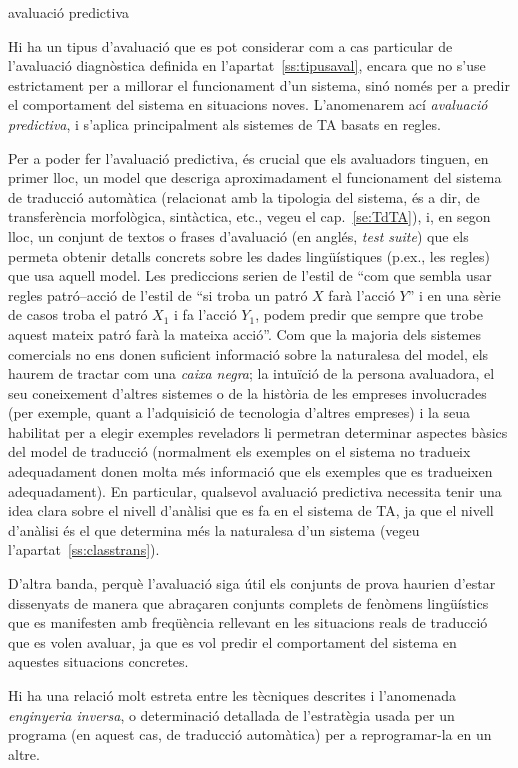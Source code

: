 \begin{persabermes}{avaluació predictiva}

  Hi ha un tipus d'avaluació que es pot considerar com a cas
  particular de l'avaluació diagnòstica definida en
  l'apartat~\ref{ss:tipusaval}, encara que no s'use estrictament per a
  millorar el funcionament d'un sistema, sinó només per a predir el
  comportament del sistema en situacions noves.  L'anomenarem ací
  \emph{avaluació predictiva}, i s'aplica principalment als sistemes
  de TA basats en regles.

  Per a poder fer l'avaluació predictiva, és crucial que els
  avaluadors tinguen, en primer lloc, un model que descriga
  aproximadament el funcionament del sistema de traducció automàtica
  (relacionat amb la tipologia del sistema, és a dir, de transferència
  morfològica, sintàctica, etc., vegeu el cap.~\ref{se:TdTA}), i, en
  segon lloc, un conjunt de textos o frases d'avaluació (en anglés,
  \emph{test suite}) que els permeta obtenir detalls concrets sobre
  les dades lingüístiques (p.ex., les regles) que usa aquell model.
  Les prediccions serien de l'estil de ``com que sembla usar regles
  patró--acció de l'estil de ``si troba un patró $X$ farà l'acció
  $Y$'' i en una sèrie de casos troba el patró $X_1$ i fa l'acció
  $Y_1$, podem predir que sempre que trobe aquest mateix patró farà la
  mateixa acció''. Com que la majoria dels sistemes comercials no ens
  donen suficient informació sobre la naturalesa del model, els haurem
  de tractar com una \emph{caixa negra}; la intuïció de la persona
  avaluadora, el seu coneixement d'altres sistemes o de la història de
  les empreses involucrades (per exemple, quant a l'adquisició de
  tecnologia d'altres empreses) i la seua habilitat per a elegir
  exemples reveladors li permetran determinar aspectes bàsics del
  model de traducció (normalment els exemples on el sistema no
  tradueix adequadament donen molta més informació que els exemples
  que es tradueixen adequadament). En particular, qualsevol avaluació
  predictiva necessita tenir una idea clara sobre el nivell d'anàlisi
  que es fa en el sistema de TA, ja que el nivell d'anàlisi és el que
  determina més la naturalesa d'un sistema (vegeu
  l'apartat~\ref{ss:classtrans}).  


  D'altra banda, perquè l'avaluació siga útil els conjunts de prova
  haurien d'estar dissenyats de manera que abraçaren conjunts complets
  de fenòmens lingüístics que es manifesten amb freqüència rellevant
  en les situacions reals de traducció que es volen avaluar, ja que es
  vol predir el comportament del sistema en aquestes situacions
  concretes.


  Hi ha una relació molt estreta entre les tècniques descrites i
  l'anomenada \emph{enginyeria inversa}, o determinació detallada de
  l'estratègia usada per un programa (en aquest cas, de traducció
  automàtica) per a reprogramar-la en un altre. 

\mbox{}
\end{persabermes}

